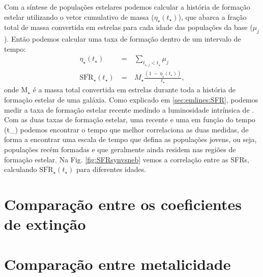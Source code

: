 Com a síntese de populações estelares podemos calcular a história de formação estelar utilizando o
vetor cumulativo de massa ($\eta_\star(t_\star)$), que abarca a fração total de massa convertida em
estrelas para cada idade das populações da base ($\mu_j$). Então podemos calcular uma taxa de
formação dentro de um intervalo de tempo:
\begin{eqnarray}
	\eta_\star(t_\star)\ &=&\ \sum\limits_{t_{\star,j} < t_\star} \mu_j \\
	\overline{\mathrm{SFR}_\star}(t_\star)\ &=&\ M_\star \frac{(1\ -\ \eta_\star(t_\star))}{t_\star},
\end{eqnarray}
\noindent onde M${}_\star$ é a massa total convertida em estrelas durante toda a história de
formação estelar de uma galáxia. 
Como explicado em \ref{sec:emlines:SFR}, podemos medir a taxa de formação estelar recente medindo a
luminosidade intrínsica de \Halpha. Com as duas taxas de formação estelar, uma recente e uma em
função do tempo (t_\star) podemos encontrar o tempo que melhor correlaciona as duas medidas, de
forma a encontrar uma escala de tempo que defina as populações jovens, ou seja, populações recém
formadas e que geralmente ainda residem nas regiões de formação estelar. Na Fig.
\ref{fig:SFRsynvsneb} vemos a correlação entre as SFRs, calculando
$\overline{\mathrm{SFR}_\star}(t_\star)$ para diferentes idades.


\section{Comparação entre os coeficientes de extinção}
\label{sec:synvsneb:tauv}

\section{Comparação entre metalicidade}
\label{sec:synvsneb:Z}

